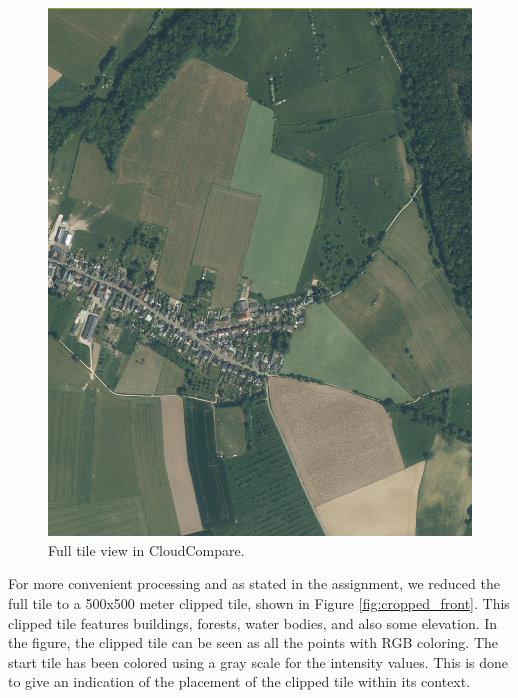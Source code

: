 \documentclass{article}
\begin{document}
\begin{figure}[h]
  \centering
  \includegraphics[width=0.8\linewidth]{img/screenshot_full_tile.png}
  \caption{Full tile view in CloudCompare.}
  \label{fig:full_tile}
\end{figure}

For more convenient processing and as stated in the assignment, we reduced the full tile to a 500x500 meter clipped tile, shown in Figure \ref{fig:cropped_front}. This clipped tile features buildings, forests, water bodies, and also some elevation. In the figure, the clipped tile can be seen as all the points with RGB coloring. The start tile has been colored using a gray scale for the intensity values. This is done to give an indication of the placement of the clipped tile within its context. 
\end{document}

